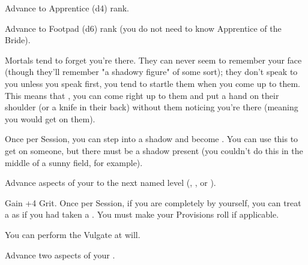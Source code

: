 \begin{multicols*}{2}


Advance  to Apprentice (d4) rank.


Advance  to Footpad (d6) rank (you do not need to know Apprentice of the Bride).



Mortals tend to forget you're there. They can never seem to remember your face (though they'll remember "a shadowy figure" of some sort); they don't speak to you unless you speak first, you tend to startle them when you come up to them. This means that , you can come right up to them and put a hand on their shoulder (or a knife in their back) without them noticing you're there (meaning you would get  on them). 


Once per Session, you can step into a shadow and become .  You can use this to get  on someone, but there must be a shadow present (you couldn't do this in the middle of a sunny field, for example).


Advance  aspects of your  to the next named level (\DEATH, \INJURY, or \INSANITY).


Gain +4 \MAX Grit. Once per Session, if you are completely by yourself, you can treat a  as if you had taken a . You must make your Provisions roll if applicable. 


You can perform the  Vulgate at will.


Advance two  aspects of your  \DCUP.


\end{multicols*}

